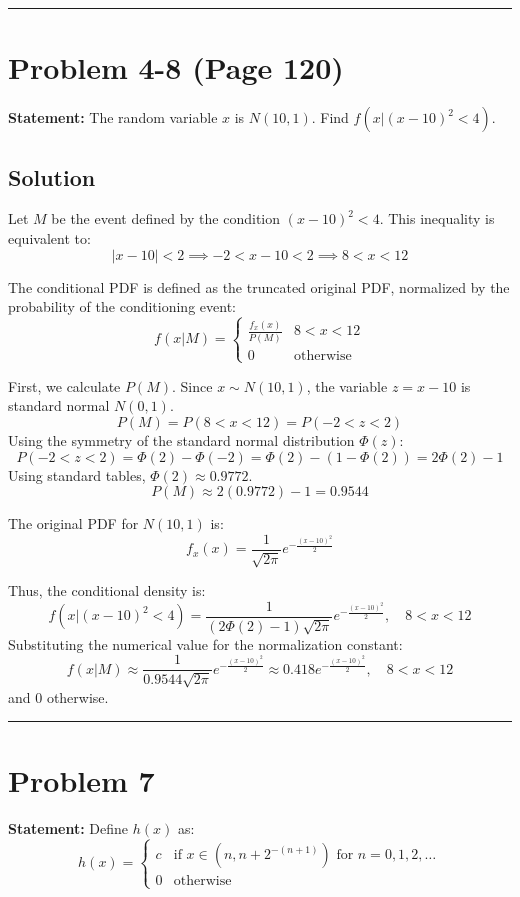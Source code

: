\documentclass{article}
\begin{document}
\vspace{1cm}
\hrule
\vspace{1cm}

\section*{Problem 4-8 (Page 120)}
\textbf{Statement:} The random variable $x$ is $N(10, 1)$. Find $f(x | (x-10)^2 < 4)$.

\subsection*{Solution}
Let $M$ be the event defined by the condition $(x-10)^2 < 4$. This inequality is equivalent to:
\[ |x - 10| < 2 \implies -2 < x - 10 < 2 \implies 8 < x < 12 \]

The conditional PDF is defined as the truncated original PDF, normalized by the probability of the conditioning event:
\[ f(x | M) = \begin{cases} \frac{f_x(x)}{P(M)} & 8 < x < 12 \\ 0 & \text{otherwise} \end{cases} \]

First, we calculate $P(M)$. Since $x \sim N(10, 1)$, the variable $z = x - 10$ is standard normal $N(0, 1)$.
\[ P(M) = P(8 < x < 12) = P(-2 < z < 2) \]
Using the symmetry of the standard normal distribution $\Phi(z)$:
\[ P(-2 < z < 2) = \Phi(2) - \Phi(-2) = \Phi(2) - (1 - \Phi(2)) = 2\Phi(2) - 1 \]
Using standard tables, $\Phi(2) \approx 0.9772$.
\[ P(M) \approx 2(0.9772) - 1 = 0.9544 \]

The original PDF for $N(10, 1)$ is:
\[ f_x(x) = \frac{1}{\sqrt{2\pi}} e^{-\frac{(x-10)^2}{2}} \]

Thus, the conditional density is:
\[ f(x | (x-10)^2 < 4) = \frac{1}{(2\Phi(2)-1)\sqrt{2\pi}} e^{-\frac{(x-10)^2}{2}}, \quad 8 < x < 12 \]
Substituting the numerical value for the normalization constant:
\[ f(x | M) \approx \frac{1}{0.9544 \sqrt{2\pi}} e^{-\frac{(x-10)^2}{2}} \approx 0.418 e^{-\frac{(x-10)^2}{2}}, \quad 8 < x < 12 \]
and 0 otherwise.

\vspace{1cm}
\hrule
\vspace{1cm}

\section*{Problem 7}

\textbf{Statement:} Define $h(x)$ as:
\[ h(x) = \begin{cases} c & \text{if } x \in (n, n + 2^{-(n+1)}) \text{ for } n = 0, 1, 2, \dots \\ 0 & \text{otherwise} \end{cases} \]
\end{document}

